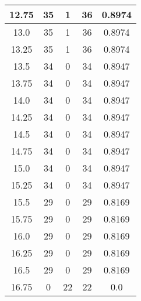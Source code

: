 \documentclass[letterpaper, 12pt]{article}
\begin{document}
\begin{longtable}{|c|c|c|c|c|}
\hline
12.75 & 35 & 1 & 36 & 0.8974 \\
\hline
13.0 & 35 & 1 & 36 & 0.8974 \\
\hline
13.25 & 35 & 1 & 36 & 0.8974 \\
\hline
13.5 & 34 & 0 & 34 & 0.8947 \\
\hline
13.75 & 34 & 0 & 34 & 0.8947 \\
\hline
14.0 & 34 & 0 & 34 & 0.8947 \\
\hline
14.25 & 34 & 0 & 34 & 0.8947 \\
\hline
14.5 & 34 & 0 & 34 & 0.8947 \\
\hline
14.75 & 34 & 0 & 34 & 0.8947 \\
\hline
15.0 & 34 & 0 & 34 & 0.8947 \\
\hline
15.25 & 34 & 0 & 34 & 0.8947 \\
\hline
15.5 & 29 & 0 & 29 & 0.8169 \\
\hline
15.75 & 29 & 0 & 29 & 0.8169 \\
\hline
16.0 & 29 & 0 & 29 & 0.8169 \\
\hline
16.25 & 29 & 0 & 29 & 0.8169 \\
\hline
16.5 & 29 & 0 & 29 & 0.8169 \\
\hline
16.75 & 0 & 22 & 22 & 0.0 \\
\hline
\end{longtable}
\end{document}
